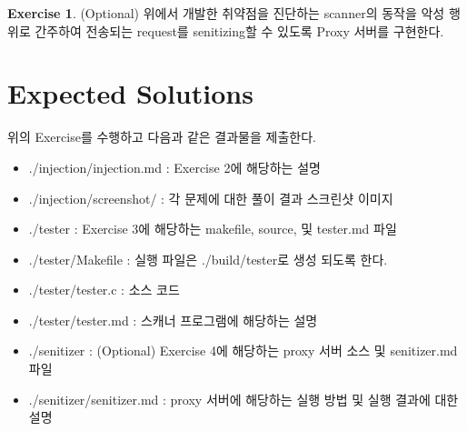 \documentclass[a4paper, 11pt]{article}
\theoremstyle{definition}
\newtheorem{exercise}{Exercise}
\begin{document}
\begin{exercise}

(Optional) 위에서 개발한 취약점을 진단하는 scanner의 동작을 악성 행위로 간주하여 전송되는 request를 senitizing할 수 있도록 Proxy 서버를 구현한다.

\end{exercise}

\section{Expected Solutions}

위의 Exercise를 수행하고 다음과 같은 결과물을 제출한다. 

\begin{itemize}
  \item ./injection/injection.md : Exercise 2에 해당하는 설명 
  \item ./injection/screenshot/ : 각 문제에 대한 풀이 결과 스크린샷 이미지 

  \item ./tester : Exercise 3에 해당하는 makefile, source, 및 tester.md 파일 
  \item ./tester/Makefile : 실행 파일은 ./build/tester로 생성 되도록 한다. 
  \item ./tester/tester.c :  소스 코드 
  \item ./tester/tester.md  : 스캐너 프로그램에 해당하는 설명 

  \item ./senitizer : (Optional) Exercise 4에 해당하는 proxy 서버 소스 및 senitizer.md 파일 
  \item ./senitizer/senitizer.md : proxy 서버에 해당하는 실행 방법 및 실행 결과에 대한 설명 
\end{itemize}



\end{document}
